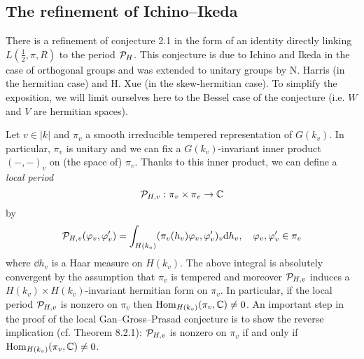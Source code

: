 \subsection{The refinement of Ichino--Ikeda}


There is a refinement of conjecture 2.1 in the form of an identity directly linking $L(\frac{1}{2}, \pi, R)$ to the period $\mathcal{P}_H$.
This conjecture is due to Ichino and Ikeda \cite{ichino2010periods} in the case of orthogonal groups and was extended to unitary groups by N. Harris \cite{harris2014refined} (in the hermitian case) and
H. Xue \cite{xue2017refined} (in the skew-hermitian case).
To simplify the exposition, we will limit ourselves here to the Bessel case of the conjecture (i.e. $W$ and $V$ are hermitian spaces).


Let $v \in |k|$ and $\pi_v$ a smooth irreducible tempered representation of $G(k_v)$.
In particular, $\pi_v$ is unitary and we can fix a $G(k_v)$-invariant inner product $(-,-)_v$ on (the space of) $\pi_v$.
Thanks to this inner product, we can define a \emph{local period}
\[
    \mathcal{P}_{H, v}: \pi_v \times \pi_v \to \mathbb{C}
\]
by
\[
    \mathcal{P}_{H, v}(\varphi_v, \varphi_v') = \int_{H(k_v)} (\pi_v(h_v) \varphi_v, \varphi_v')_v \mathrm{d} h_v, \quad \varphi_v, \varphi_v' \in \pi_v
\]
where $\dd h_v$ is a Haar measure on $H(k_v)$.
The above integral is absolutely convergent by the assumption that $\pi_v$ is tempered and moreover $\mathcal{P}_{H, v}$ induces a $H(k_v) \times H(k_v)$-invariant hermitian form on $\pi_v$.
In particular, if the local period $\mathcal{P}_{H, v}$ is nonzero on $\pi_v$ then $\mathrm{Hom}_{H(k_v)}(\pi_v, \mathbb{C}) \neq 0$.
An important step in the proof of the local Gan--Gross--Prasad conjecture is to show the reverse implication (cf. \cite{beuzart2015local} Theorem 8.2.1): $\mathcal{P}_{H, v}$ is nonzero on $\pi_v$ if and only if $\mathrm{Hom}_{H(k_v)}(\pi_v, \mathbb{C}) \neq 0$.

